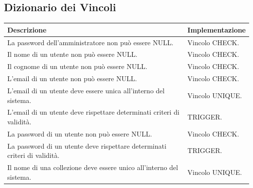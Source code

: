 \documentclass[a4paper]{article}
\begin{document}
	\subsection{Dizionario dei Vincoli}
	\vspace{8pt}
	\begin{tabular}{p{150pt}p{120pt}}
		\hline
		\textbf{Descrizione} &
		\textbf{Implementazione}
		\\
		\hline
		\hline
		\hline
		
		La password dell'amministratore non può essere NULL.&
		Vincolo CHECK.
		\\
		\hline
		
		Il nome di un utente non può essere NULL. &
		Vincolo CHECK.
		\\
		\hline
		
		Il cognome di un utente non può essere NULL. &
		Vincolo CHECK.
		\\
		\hline

		L'email di un utente non può essere NULL. &
		Vincolo CHECK.
		\\
		\hline
		
		L'email di un utente deve essere unica all'interno
		del sistema. &
		Vincolo UNIQUE.
		\\
		\hline
		
		L'email di un utente deve rispettare determinati
		criteri di validità. &
		TRIGGER.
		\\
		\hline
		
		La password di un utente non può essere NULL.&
		Vincolo CHECK.
		\\
		\hline

		La password di un utente deve rispettare determinati
		criteri di validità. &
		TRIGGER.
		\\
		\hline

		Il nome di una collezione deve essere unico
		all'interno
		del sistema. &
		Vincolo UNIQUE.
		\\
		\hline
	\end{tabular}
	\newpage
	
\end{document}
